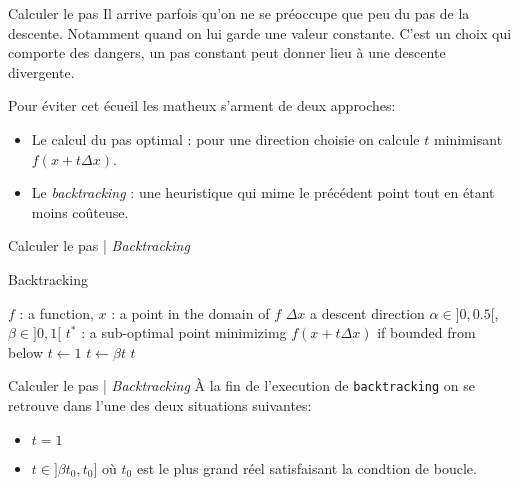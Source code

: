 \documentclass[aspectratio = 169]{beamer}
\begin{document}
\begin{frame}{Calculer le pas}
  Il arrive parfois qu'on ne se préoccupe que peu du pas de la
  descente. Notamment quand on lui garde une valeur constante. C'est
  un choix qui comporte des dangers, un pas constant peut donner lieu
  à une descente divergente. \pause

  Pour éviter cet écueil les matheux s'arment de deux approches:
  \begin{itemize}
  \item<3-> Le calcul du pas optimal : pour une direction choisie on
    calcule $t$ minimisant $f(x + t\Delta x)$.
  \item<4-> Le \emph{backtracking} : une heuristique qui mime le
    précédent point tout en étant moins coûteuse.
  \end{itemize}
\end{frame}

\begin{frame}{Calculer le pas | \emph{Backtracking}}
    \begin{algorithm}[H]
    \caption{Backtracking}
    \small{
      \begin{algorithmic}[1]
        \Statex
        \Require $f$ : a function,  $x$ : a point in the domain of $f$
        \Require $\Delta x$ a descent direction
        \Require $\alpha \in ]0, 0.5[$, $\beta \in ]0, 1[$
        \Ensure $t^*$ : a sub-optimal point minimizimg $f(x + t\Delta x)$ if bounded from below
        \Statex
        \State $t \leftarrow 1$
        \State $t \leftarrow \beta t$
        \EndWhile
        \State \Return $t$
        \EndFunction
        \Statex
      \end{algorithmic}
    }
  \end{algorithm}
\end{frame}

\begin{frame}{Calculer le pas | \emph{Backtracking}}
  À la fin de l'execution de \texttt{backtracking} on se retrouve dans
  l'une des deux situations suivantes:
  \begin{itemize}
  \item<2-> $t = 1$
  \item<3-> $t \in ]\beta t_0, t_0]$ où $t_0$ est le plus grand réel
    satisfaisant la condtion de boucle.
  \end{itemize}
\end{frame}
\end{document}
